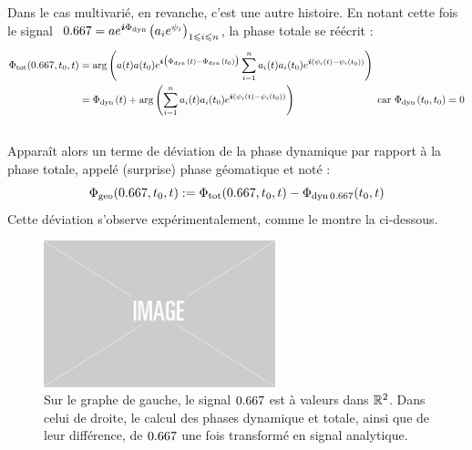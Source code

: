 Dans le cas multivarié, en revanche, c'est une autre histoire. En notant cette fois le signal $\ \x = ae^{\i \phased} \big( a_ie^{\psi_i} \big)_{1\leq i\leq n}$, la phase totale se réécrit :
\begin{equation}\label{eq:diff_phases_t/d}
	\begin{aligned}
		\phaset(\x,t_0, t) &= \arg \left(a(t)a(t_0) e^{\i \big(\phased(t) - \phased(t_0)\big)}\sum_{i=1}^n a_i(t)a_i(t_0)e^{\i (\psi_i(t)-\psi_i(t_0))} \right) \\
		&= \phased(t) + \arg \left(\sum_{i=1}^n a_i(t)a_i(t_0)e^{\i (\psi_i(t)-\psi_i(t_0))} \right)  \qquad\qquad\qquad\qquad \text{car } \phased(t_0,t_0) = 0
	\end{aligned}
\end{equation}
\\
Apparaît alors un terme de déviation de la phase dynamique par rapport à la phase totale, appelé (surprise) phase géomatique et noté :
\begin{equation}\label{eq:phase_g}
	\phaseg(\x,t_0,t) \defeq \phaset(\x, t_0,t) - \phased[\x](t_0,t)
\end{equation}
Cette déviation s'observe expérimentalement, comme le montre la  ci-dessous.
\\
\begin{figure}[h]
	\includegraphics[width=0.6\textwidth]{fig/placeholder}
	\caption[Déviation de la phase dynamique d'un signal bivarié par rapport à sa phase totale]{Sur le graphe de gauche, le signal $\x$ est à valeurs dans $\mathbb{R}^2$. Dans celui de droite, le calcul des phases dynamique et totale,  ainsi que de leur différence, de $\x$ une fois transformé en signal analytique. %
	}
	\label{fig:calc_diff_phases}
\end{figure}
\\

